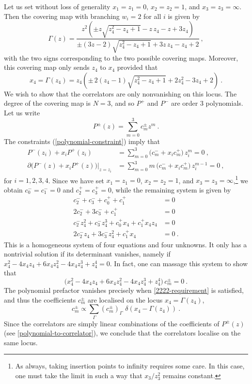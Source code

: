 \documentclass[a4paper,11pt]{article}
\numberwithin{equation}{section}
\begin{document}
Let us set without loss of generality $x_1=z_1=0$, $x_2=z_2=1$, and $x_3=z_3=\infty$. Then the covering map with branching $w_i=2$ for all $i$ is given by
\begin{equation}
\Gamma(z)=\frac{z^2\left(\pm z\sqrt{z_4^2-z_4+1}-z\,z_4-z+3z_4\right)}{\pm(3z-2)\sqrt{z_4^2-z_4+1}+3z\,z_4-z_4+2} \ , 
\end{equation}
with the two signs corresponding to the two possible covering maps. Moreover, this covering map only sends $z_4$ to $x_4$ provided that
\begin{equation}
x_4=\Gamma(z_4)=z_4\left(\pm\,2(z_4-1)\sqrt{z_4^2-z_4+1}+2z_4^2-3z_4+2\right)\ .
\label{2222-requirement}
\end{equation}
We wish to show that the correlators are only nonvanishing on this locus. The degree of the covering map is $N=3$, and so $P^+$ and $P^-$ are order 3 polynomials. Let us write
\begin{equation}
P^{\pm}(z)=\sum_{m=0}^{3}c^{\pm}_mz^m\ .
\end{equation}
The constraints (\ref{polynomial-constraint}) imply that 
\begin{equation}
\begin{split}
P^-(z_i)+x_iP^+(z_i)&=\sum_{m=0}^{3}\bigl(c^-_m+x_ic^+_m\bigr)\, z_i^m=0\ ,\\
\partial\bigl(P^-(z)+x_iP^+(z)\bigr)\Big|_{z=z_i}&=\sum_{m=0}^{3}m\, 
\bigl(c^-_m+x_ic^+_m\bigr)\, z_i^{m-1}=0\ , \end{split}
\end{equation}
for $i=1,2,3,4$. Since we have set $x_1=z_1=0$, $x_2=z_2=1$, and $x_3=z_3=\infty$,\footnote{As always, taking insertion points to infinity requires some care. In this case, one must take the limit in such a way that $x_3/z_3^2$ remains constant.} we obtain $c^-_0=c^-_1=0$ and $c^+_2=c^+_3=0$, while the remaining system is given by
\begin{equation}
\begin{split}
c^-_2+c^-_3+c^+_0+c_1^+&=0\\
2c_2^-+3c_3^-+c_1^+&=0\\
c^-_2z_4^2+c^-_3z_4^3+c^+_0x_4+c_1^+x_4z_4&=0\\
2c_2^-z_4+3c_3^-z_4^2+c_1^+x_4&=0\ .
\end{split}
\end{equation}
This is a homogeneous system of four equations and four unknowns. It only has a nontrivial solution if its determinant vanishes, namely if $x_4^2-4x_4z_4+6x_4z_4^2-4x_4z_4^3+z_4^4=0$. In fact, one can massage this system to show that
\begin{equation}
\bigl(x_4^2-4x_4z_4+6x_4z_4^2-4x_4z_4^3+z_4^4\bigr)\, c_m^{\pm}=0\ .
\end{equation}
The polynomial prefactor vanishes precisely when \eqref{2222-requirement} is satisfied, and thus the coefficients $c_m^{\pm}$ are localised on the locus $x_4=\Gamma(z_4)$,
\begin{equation}
c_m^{\pm}\propto\sum_{\Gamma}(c_m^{\pm})_\Gamma\,\, \delta(x_4-\Gamma(z_4))\ .
\end{equation}
Since the correlators are simply linear combinations of the coefficients of $P^{\pm}(z)$ (see \eqref{polynomial-to-correlator}), we conclude that the correlators localise on the same locus. 
\end{document}

